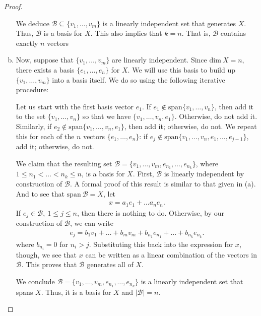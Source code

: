 \documentclass[11pt]{article}
\theoremstyle{mystyle}
\newcommand{\0}{\mathbf{0}}
\begin{document}
\begin{proof}
\begin{enumerate}[(a)]
    We deduce $\mathcal{B} \subseteq \{v_1, \ldots, v_m\}$ is a linearly independent set that generates $X$. Thus, $\mathcal{B}$ is a basis for $X$. This also implies that $k = n$. That is, $\mathcal{B}$ contains exactly $n$ vectors
    
    \item Now, suppose that $\{v_1, \ldots, v_m\}$ are linearly independent. Since $\text{dim} \ X = n$, there exists a basis $\{e_1, \ldots, e_n\}$ for $X$. We will use this basis to build up $\{v_1, \ldots, v_m\}$ into a basis itself. We do so using the following iterative procedure:
    
    Let us start with the first basis vector $e_1$. If $e_1 \notin \text{span}\{v_1, \ldots, v_n\}$, then add it to the set $\{v_1, \ldots, v_n\}$ so that we have $\{v_1, \ldots, v_n, e_1\}$. Otherwise, do not add it. Similarly, if $e_2 \notin \text{span}\{v_1, \ldots, v_n, e_1\}$, then add it; otherwise, do not. We repeat this for each of the $n$ vectors $\{e_1, \ldots, e_n\}$: if $e_j \notin \text{span}\{v_1, \ldots, v_n, e_1, \ldots, e_{j-1}\}$, add it; otherwise, do not.
    
    We claim that the resulting set $\mathcal{B} = \{v_1, \ldots, v_m, e_{n_1}, \ldots, e_{n_k}\}$, where $1 \leq n_1 < \ldots < n_k \leq n$, is a basis for $X$. First, $\mathcal{B}$ is linearly independent by construction of $\mathcal{B}$. A formal proof of this result is similar to that given in (a). And to see that  $\text{span} \ \mathcal{B} = X$, let
    \begin{align*}
        x = a_1 e_1 + \ldots a_n e_n.
    \end{align*}
    If $e_j \in \mathcal{B}, \ 1 \leq j \leq n$, then there is nothing to do. Otherwise, by our construction of $\mathcal{B}$, we can write
    \begin{align*}
        e_j = b_1v_1 + \ldots + b_mv_m + b_{n_1}e_{n_1} + \ldots + b_{n_k}e_{n_k}.
    \end{align*}
    where $b_{n_i} = 0$ for $n_i > j$. Substituting this back into the expression for $x$, though, we see that $x$ can be written as a linear combination of the vectors in $\mathcal{B}$. This proves that $\mathcal{B}$ generates all of $X$.
    
    We conclude $\mathcal{B} = \{v_1, \ldots, v_m, e_{n_1}, \ldots, e_{n_k}\}$ is a linearly independent set that spans $X$. Thus, it is a basis for $X$ and $|\mathcal{B}| = n$.
\end{enumerate}
\end{proof}
\end{document}
